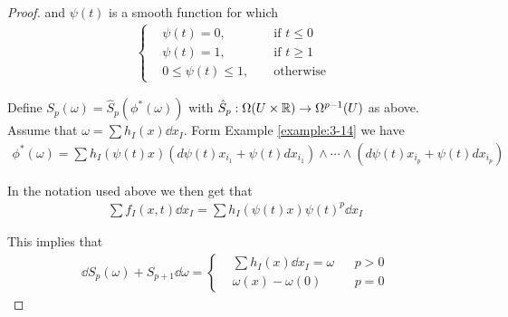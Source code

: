 \begin{proof}
and $\psi(t)$ is a smooth function for which 
\begin{align}
  \left\{\begin{aligned}
    & \psi(t) = 0, && \text{ if } t\le 0 \\
    & \psi(t) = 1, && \text{ if } t\ge 1 \\
    & 0\le\psi(t)\le 1, && \text{ otherwise }
  \end{aligned}\right.
\end{align}

Define $S_p(\omega) = \hat{S}_p(\phi^*(\omega))$ with $\hat{S}_p:\Omega(U\times\mathbb{R})\to\Omega^{p-1}(U)$ as above. Assume 
that $\omega = \sum h_I(x)\dd x_I$. Form Example \ref{example:3-14} we have 
\begin{align*}
  \phi^{*}(\omega)
  = \sum h_{I}(\psi(t)x)(d\psi(t)x_{i_{1}}+\psi(t)dx_{i_{1}})
    \wedge\cdots\wedge\left(d\psi(t)x_{i_{p}}+\psi(t)dx_{i_{p}}\right)  
\end{align*}

In the notation used above we then get that 
\begin{align*}
  \sum f_I(x, t)\dd x_I = \sum h_I(\psi(t)x)\psi(t)^p\dd x_I
\end{align*}

This implies that 
\begin{align*}
  \dd S_p(\omega) + S_{p+1}\dd\omega
  = \left\{\begin{aligned}
    & \sum h_I(x)\dd x_I = \omega &&  p > 0 \\
    & \omega(x) - \omega(0) &&  p = 0
  \end{aligned}\right.
\end{align*}
\end{proof}